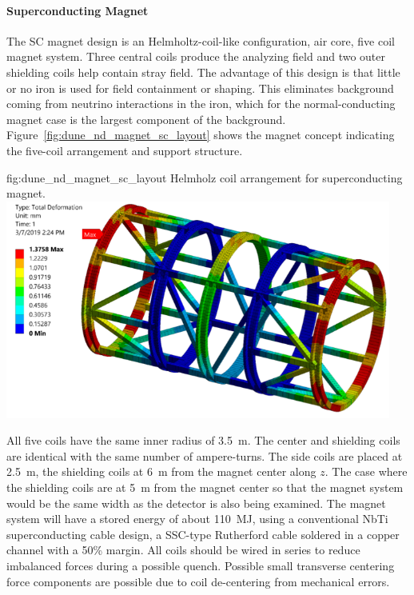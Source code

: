 \paragraph{Superconducting Magnet}
%
The SC magnet design is an Helmholtz-coil-like configuration, air core,  five coil magnet system. Three central coils produce the analyzing field and two outer shielding coils help contain stray field. The advantage of this design is that little or no iron is used for field containment or shaping. This eliminates background coming from neutrino interactions in the iron, which for the normal-conducting magnet case is the largest component of the background. Figure~\ref{fig:dune_nd_magnet_sc_layout} shows the magnet concept indicating the five-coil arrangement and support structure. 
%
%
\begin{dunefigure}{fig:dune_nd_magnet_sc_layout}
{Helmholz coil arrangement for  superconducting magnet.}
\includegraphics[width=0.95\textwidth]{graphics/SC_mag_st.png}
\end{dunefigure}
%
All five coils have the same inner radius of \SI{3.5}{m}. The center and shielding coils are identical with the same number of ampere-turns. The side coils are placed at \SI{2.5}{m}, the shielding coils at \SI{6}{m} from the magnet center along $z$.  The case where the shielding coils are at \SI{5}{m} from the magnet center so that the magnet system would be the same width as the   detector is also being examined.  The magnet system will have a stored energy of about \SI{110}{MJ}, using a conventional NbTi superconducting cable design, a SSC-type Rutherford cable soldered in a copper channel with a 50\% margin. All coils should be wired in series to reduce imbalanced forces during a possible quench. Possible small transverse centering force components are possible due to coil de-centering from mechanical errors. 

